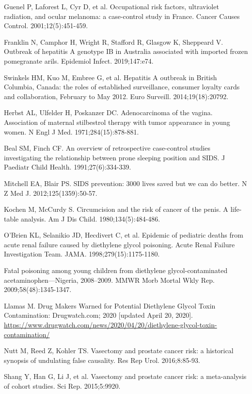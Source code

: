 \begin{references}
\item Guenel P, Laforest L, Cyr D, et al. Occupational risk factors, ultraviolet radiation, and ocular melanoma: a case-control study in France. Cancer Causes Control. 2001;12(5):451-459.
\item Franklin N, Camphor H, Wright R, Stafford R, Glasgow K, Sheppeard V. Outbreak of hepatitis A genotype IB in Australia associated with imported frozen pomegranate arils. Epidemiol Infect. 2019;147:e74.
\item Swinkels HM, Kuo M, Embree G, et al. Hepatitis A outbreak in British Columbia, Canada: the roles of established surveillance, consumer loyalty cards and collaboration, February to May 2012. Euro Surveill. 2014;19(18):20792.
\item Herbst AL, Ulfelder H, Poskanzer DC. Adenocarcinoma of the vagina. Association of maternal stilbestrol therapy with tumor appearance in young women. N Engl J Med. 1971;284(15):878-881.
\item Beal SM, Finch CF. An overview of retrospective case-control studies investigating the relationship between prone sleeping position and SIDS. J Paediatr Child Health. 1991;27(6):334-339.
\item Mitchell EA, Blair PS. SIDS prevention: 3000 lives saved but we can do better. N Z Med J. 2012;125(1359):50-57.
\item Kochen M, McCurdy S. Circumcision and the risk of cancer of the penis. A life-table analysis. Am J Dis Child. 1980;134(5):484-486.
\item O'Brien KL, Selanikio JD, Hecdivert C, et al. Epidemic of pediatric deaths from acute renal failure caused by diethylene glycol poisoning. Acute Renal Failure Investigation Team. JAMA. 1998;279(15):1175-1180.
\item Fatal poisoning among young children from diethylene glycol-contaminated acetaminophen—Nigeria, 2008–2009. MMWR Morb Mortal Wkly Rep. 2009;58(48):1345-1347.
\item Llamas M. Drug Makers Warned for Potential Diethylene Glycol Toxin Contamination: Drugwatch.com; 2020 [updated April 20, 2020]. \url{https://www.drugwatch.com/news/2020/04/20/diethylene-glycol-toxin-contamination/}
\item Nutt M, Reed Z, Kohler TS. Vasectomy and prostate cancer risk: a historical synopsis of undulating false causality. Res Rep Urol. 2016;8:85-93.
\item Shang Y, Han G, Li J, et al. Vasectomy and prostate cancer risk: a meta-analysis of cohort studies. Sci Rep. 2015;5:9920.

\end{references}
